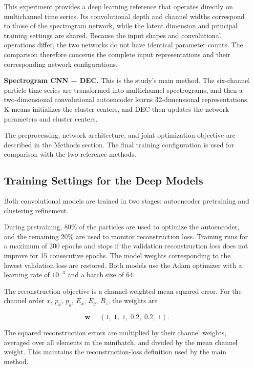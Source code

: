 This experiment provides a deep learning reference that operates directly on multichannel time series. Its convolutional depth and channel widths correspond to those of the spectrogram network, while the latent dimension and principal training settings are shared. Because the input shapes and convolutional operations differ, the two networks do not have identical parameter counts. The comparison therefore concerns the complete input representations and their corresponding network configurations.

\noindent\textbf{Spectrogram CNN + DEC.} This is the study's main method. The six-channel particle time series are transformed into multichannel spectrograms, and then a two-dimensional convolutional autoencoder learns 32-dimensional representations. K-means initializes the cluster centers, and DEC then updates the network parameters and cluster centers.

The preprocessing, network architecture, and joint optimization objective are described in the Methods section. The final training configuration is used for comparison with the two reference methods.

\subsection{Training Settings for the Deep Models}

Both convolutional models are trained in two stages: autoencoder pretraining and clustering refinement.

During pretraining, 80\% of the particles are used to optimize the autoencoder, and the remaining 20\% are used to monitor reconstruction loss. Training runs for a maximum of 200 epochs and stops if the validation reconstruction loss does not improve for 15 consecutive epochs. The model weights corresponding to the lowest validation loss are restored. Both models use the Adam optimizer with a learning rate of \(10^{-3}\) and a batch size of 64.

The reconstruction objective is a channel-weighted mean squared error. For the channel order \(x\), \(p_x\), \(p_y\), \(E_x\), \(E_y\), \(B_z\), the weights are

\begin{equation} \boldsymbol{w}=(1,\;1,\;1,\;0.2,\;0.2,\;1). \end{equation}

The squared reconstruction errors are multiplied by their channel weights, averaged over all elements in the minibatch, and divided by the mean channel weight. This maintains the reconstruction-loss definition used by the main method.

